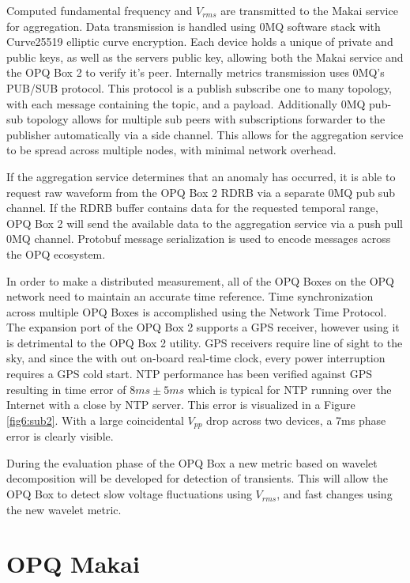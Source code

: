 Computed fundamental frequency and $V_{rms}$ are transmitted to the Makai service for aggregation. Data transmission is handled using 0MQ software stack with Curve25519 elliptic curve encryption. Each device holds a unique of private and public keys, as well as the servers public key, allowing both the Makai service and the OPQ Box 2 to verify it's peer. Internally metrics transmission uses 0MQ's PUB/SUB protocol. This protocol is a publish subscribe one to many topology, with each message containing the topic, and a payload. Additionally 0MQ pub-sub topology allows for multiple sub peers with subscriptions forwarder to the publisher automatically via a side channel. This allows for the aggregation service to be spread across multiple nodes, with minimal network overhead.

If the aggregation service determines that an anomaly has occurred, it is able to request raw waveform from the OPQ Box 2 RDRB via a separate 0MQ pub sub channel. If the RDRB buffer contains data for the requested temporal range, OPQ Box 2 will send the available data to the aggregation service via a push pull 0MQ channel. Protobuf message serialization is used to encode messages across the OPQ ecosystem. 

In order to make a distributed measurement, all of the OPQ Boxes on the OPQ network need to maintain an accurate time reference. Time synchronization across multiple OPQ Boxes is accomplished using the Network Time Protocol. The expansion port of the OPQ Box 2 supports a GPS receiver, however using it is detrimental to the OPQ Box 2 utility. GPS receivers require line of sight to the sky, and since the with out on-board real-time clock, every power interruption requires a GPS cold start. NTP performance has been verified against GPS resulting in time error of $8ms\pm 5ms$ which is typical for NTP running over the Internet with a close by NTP server. This error is visualized in a Figure \ref{fig6:sub2}. With a large coincidental $V_{pp}$ drop across two devices, a 7ms phase error is clearly visible.

During the evaluation phase of the OPQ Box a new metric based on wavelet decomposition will be developed for detection of transients. This will allow the OPQ Box to detect slow voltage fluctuations using $V_{rms}$, and fast changes using the new wavelet metric.

\section{OPQ Makai}

